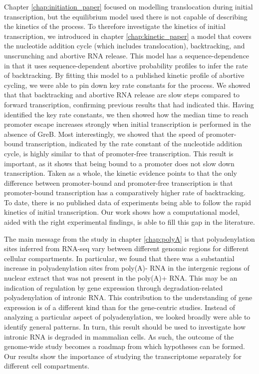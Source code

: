 Chapter \ref{chap:initiation_paper} focused on modelling translocation during
initial transcription, but the equilibrium model used there is not capable of
describing the kinetics of the process. To therefore investigate the kinetics
of initial transcription, we introduced in chapter \ref{chap:kinetic_paper} a
model that covers the nucleotide addition cycle (which includes
translocation), backtracking, and unscrunching and abortive RNA release. This
model has a sequence-dependence in that it uses sequence-dependent abortive
probability profiles to infer the rate of backtracking. By fitting this model
to a published kinetic profile of abortive cycling, we were able to pin down
key rate constants for the process. We showed that that backtracking and
abortive RNA release are slow steps compared to forward transcription,
confirming previous results that had indicated this. Having identified the key
rate constants, we then showed how the median time to reach promoter escape
increases strongly when initial transcription is performed in the absence of
GreB. Most interestingly, we showed that the speed of promoter-bound
transcription, indicated by the rate constant of the nucleotide addition
cycle, is highly similar to that of promoter-free transcription. This result
is important, as it shows that being bound to a promoter does not slow down
transcription. Taken as a whole, the kinetic evidence points to that the only
difference between promoter-bound and promoter-free transcription is that
promoter-bound transcription has a comparatively higher rate of backtracking.
To date, there is no published data of experiments being able to follow the
rapid kinetics of initial transcription. Our work shows how a computational
model, aided with the right experimental findings, is able to fill this gap in
the literature.

The main message from the study in chapter \ref{chap:polyA} is that
polyadenylation sites inferred from RNA-seq vary between different genomic
regions for different cellular compartments. In particular, we found that there
was a substantial increase in polyadenylation sites from poly(A)- RNA in the
intergenic regions of nuclear extract that was not present in the poly(A)+ RNA.
This may be an indication of regulation by gene expression through
degradation-related polyadenylation of intronic RNA. This contribution to the
understanding of gene expression is of a different kind than for the
gene-centric studies. Instead of analyzing a particular aspect of
polyadenylation, we looked broadly were able to identify general patterns. In
turn, this result should be used to investigate how intronic RNA is degraded in
mammalian cells. As such, the outcome of the genome-wide study becomes a
roadmap from which hypotheses can be formed. Our results show the importance
of studying the transcriptome separately for different cell compartments.

